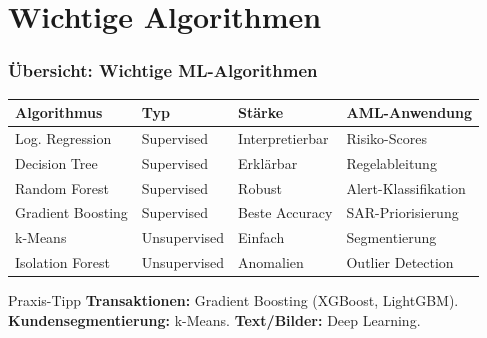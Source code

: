 \documentclass[11pt, aspectratio=169]{beamer}
\begin{document}
\section{Wichtige Algorithmen}

\begin{frame}
    \frametitle{Übersicht: Wichtige ML-Algorithmen}
    \begin{table}
        \centering
        \small
        \begin{tabular}{@{}llll@{}}
            \toprule
            \textbf{Algorithmus} & \textbf{Typ} & \textbf{Stärke} & \textbf{AML-Anwendung} \\
            \midrule
            Log. Regression & Supervised & Interpretierbar & Risiko-Scores \\
            Decision Tree & Supervised & Erklärbar & Regelableitung \\
            Random Forest & Supervised & Robust & Alert-Klassifikation \\
            Gradient Boosting & Supervised & Beste Accuracy & SAR-Priorisierung \\
            k-Means & Unsupervised & Einfach & Segmentierung \\
            Isolation Forest & Unsupervised & Anomalien & Outlier Detection \\
            \bottomrule
        \end{tabular}
    \end{table}
    \vspace{0.3cm}
    \begin{alertblock}{Praxis-Tipp}
        \textbf{Transaktionen:} Gradient Boosting (XGBoost, LightGBM). \textbf{Kundensegmentierung:} k-Means. \textbf{Text/Bilder:} Deep Learning.
    \end{alertblock}
\end{frame}
\end{document}
